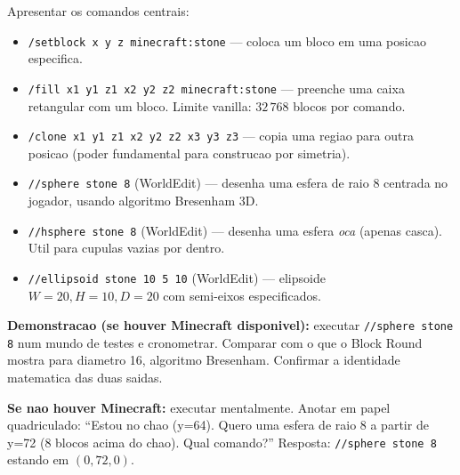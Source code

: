 \documentclass[12pt,a4paper]{scrartcl}
\newcommand{\cmd}[1]{\textcolor{earth}{\texttt{\small #1}}}
\newcommand{\tempo}[1]{\textnormal{\footnotesize\color{bg!90!white}\textsf{#1}}}
\begin{document}
\begin{atividade}[4.2 --- Comandos Minecraft \quad\tempo{15 min}]\label{at:42}
Apresentar os comandos centrais:

\begin{itemize}[leftmargin=1.4em,itemsep=0.25em,topsep=0.3em]
  \item \cmd{/setblock x y z minecraft:stone} --- coloca um bloco em uma posicao especifica.
  \item \cmd{/fill x1 y1 z1 x2 y2 z2 minecraft:stone} --- preenche uma caixa retangular com um bloco. Limite vanilla: $32\,768$ blocos por comando.
  \item \cmd{/clone x1 y1 z1 x2 y2 z2 x3 y3 z3} --- copia uma regiao para outra posicao (poder fundamental para construcao por simetria).
  \item \cmd{//sphere stone 8} (WorldEdit) --- desenha uma esfera de raio 8 centrada no jogador, usando algoritmo Bresenham 3D.
  \item \cmd{//hsphere stone 8} (WorldEdit) --- desenha uma esfera \emph{oca} (apenas casca). Util para cupulas vazias por dentro.
  \item \cmd{//ellipsoid stone 10 5 10} (WorldEdit) --- elipsoide $W = 20, H = 10, D = 20$ com semi-eixos especificados.
\end{itemize}

\textbf{Demonstracao (se houver Minecraft disponivel):} executar \cmd{//sphere stone 8} num mundo de testes e cronometrar. Comparar com o que o Block Round mostra para diametro 16, algoritmo Bresenham. Confirmar a identidade matematica das duas saidas.

\textbf{Se nao houver Minecraft:} executar mentalmente. Anotar em papel quadriculado: \enquote{Estou no chao (y=64). Quero uma esfera de raio 8 a partir de y=72 (8 blocos acima do chao). Qual comando?} Resposta: \cmd{//sphere stone 8} estando em $(0, 72, 0)$.
\end{atividade}
\end{document}
